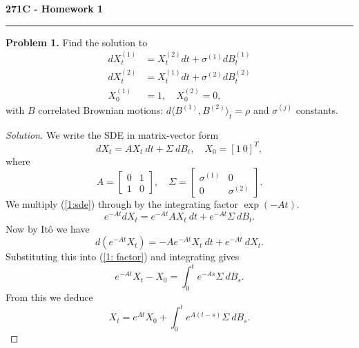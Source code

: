 \documentclass[11pt,letterpaper]{report}
\newenvironment{solution}
{\begin{proof}[Solution]}
{\end{proof}}
\begin{document}
\begin{center}
{\bf \Large 271C - Homework 1}
\vspace{0.2cm}
\hrule
\end{center}

\noindent\textbf{Problem 1. }
Find the solution to
\begin{align*}
	dX^{(1)}_t &= X^{(2)}_tdt + \sigma^{(1)}dB^{(1)}_t\\
	dX^{(2)}_t &= X^{(1)}_tdt + \sigma^{(2)}dB^{(2)}_t\\
	X^{(1)}_0 &= 1,\quad X^{(2)}_0=0,
\end{align*}
with $B$ correlated Brownian motions: $d\langle B^{(1)}, B^{(2)}\rangle_t = \rho$ and $\sigma^{(j)}$ constants.
\begin{solution}
	We write the SDE in matrix-vector form
	\begin{equation}\label{1:sde}
	dX_t = AX_t\ dt + \Sigma\ dB_t,\quad X_0 = [1\ 0]^T,
	\end{equation}
	where
	\[
	A = \begin{bmatrix}
		0&1\\
		1&0
	\end{bmatrix},\quad \Sigma = \begin{bmatrix}
		\sigma^{(1)} & 0\\
		0 & \sigma^{(2)}
	\end{bmatrix}.
	\]
	We multiply (\ref{1:sde}) through by the integrating factor $\exp(-At)$.
	\begin{equation}\label{1: factor}
	e^{-At}dX_t = e^{-At}AX_t\ dt + e^{-At}\Sigma\ dB_t.
	\end{equation}
	Now by It\^o we have
	\[
	d(e^{-At}X_t) = -Ae^{-At}X_t\ dt + e^{-At}\ dX_t.
	\]
	Substituting this into (\ref{1: factor}) and integrating gives
	\[
	e^{-At}X_t - X_0 = \int_0^te^{-As}\Sigma\ dB_s.
	\]
	From this we deduce
	\[
	X_t = e^{At}X_0 + \int_0^te^{A(t-s)}\Sigma\ dB_s.
	\]

\end{solution}
\end{document}
